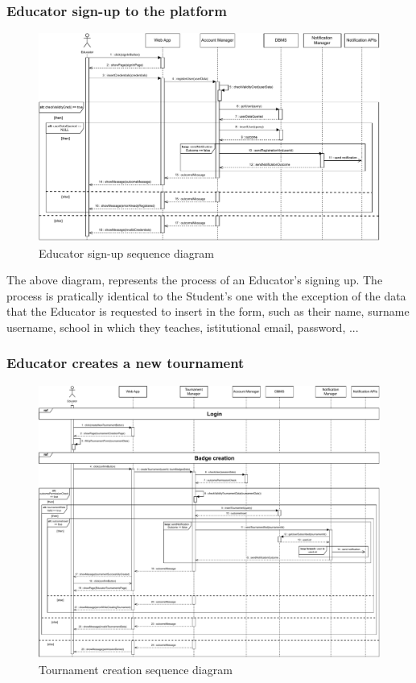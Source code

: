 \documentclass{article}
\begin{document}
{    \subsubsection{Educator sign-up to the platform}
        \begin{figure}[H]
            \centering
            \hspace*{-2.2cm}\includegraphics[scale=0.65]{Sequence/Sequence2DD.pdf}
            \caption{Educator sign-up sequence diagram}
            \label{fig:Sequence2DD}
        \end{figure}

        The above diagram, represents the process of an Educator's signing up.
        The process is pratically identical to the Student's one with the exception of the
        data that the Educator is requested to insert in the form, such as their name, surname
        username, school in which they teaches, istitutional email, password, ... 

    \subsubsection{Educator creates a new tournament}
        \begin{figure}[H]
            \centering
            \hspace*{-4cm}\includegraphics[scale=0.65]{Sequence/Sequence3DD.pdf}
            \caption{Tournament creation sequence diagram}
            \label{fig:Sequence3DD}
        \end{figure}

}
\end{document}
